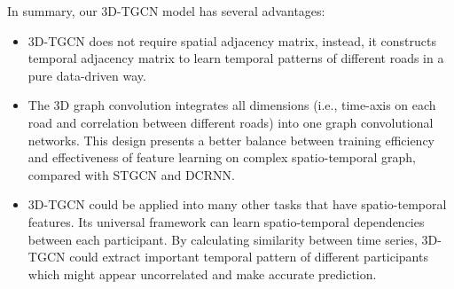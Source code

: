 \documentclass{article}
\begin{document}
In summary, our 3D-TGCN model has several advantages:
\begin{itemize}
\item 3D-TGCN does not require  spatial adjacency matrix, instead, it constructs temporal adjacency matrix to learn temporal patterns of different roads in a pure data-driven way. 
\item The 3D graph convolution integrates all dimensions (i.e., time-axis on each road and correlation between different roads) into one graph convolutional networks. This design presents a better balance between training efficiency and effectiveness of feature learning on complex spatio-temporal graph, compared with STGCN and DCRNN. 
\item 3D-TGCN could be applied into many other tasks that have spatio-temporal features. Its universal framework can learn spatio-temporal dependencies between each participant. By calculating similarity between time series, 3D-TGCN could extract  important temporal pattern of different participants which might appear uncorrelated and make accurate prediction.
\end{itemize}
\end{document}
